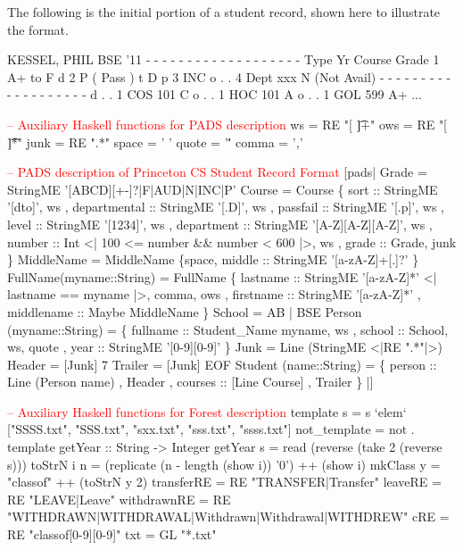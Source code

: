 The following is the initial portion of a student record, shown here
to illustrate the format.
\begin{code}
KESSEL, PHIL	   BSE   '11
- - - - - - - - - - - - - - - - - - -
Type    Yr  Course     Grade
         1             A+ to F
d        2             P  (  Pass )
t  D  p  3             INC
o  .  .  4  Dept  xxx  N  (Not Avail)
- - - - - - - - - - - - - - - - - - -
d  .  .  1  COS   101  C
o  .  .  1  HOC   101  A
o  .  .  1  GOL   599  A+
...
\end{code}

\begin{code}
\textcolor{red}{-- Auxiliary Haskell functions for PADS description}
ws   = RE "[ \t]+"
ows  = RE "[ \t]*"
junk = RE ".*"
space = ' '
quote = '\''
comma = ','
\end{code}

\begin{code}
\textcolor{red}{-- PADS description of Princeton CS Student Record Format}
[pads| 
   Grade = StringME '[ABCD][+-]?|F|AUD|N|INC|P'
\mbox{}
   Course = Course
    \{ sort         :: StringME '[dto]',      ws
    , departmental :: StringME '[.D]',       ws
    , passfail     :: StringME '[.p]',       ws
    , level        :: StringME '[1234]',          ws
    , department   :: StringME '[A-Z][A-Z][A-Z]', ws
    , number       :: Int  <| 100 <= number && number < 600 |>, ws
    , grade        :: Grade,                 junk                               
    \} 
\mbox{}
   MiddleName = MiddleName \{space, middle :: StringME '[a-zA-Z]+[.]?' \}           
\mbox{} 
   FullName(myname::String) = FullName
    \{ lastname   :: StringME '[a-zA-Z]*'   <| lastname ==  myname |>,  comma, ows     
    , firstname  :: StringME '[a-zA-Z]*' 
    , middlename :: Maybe MiddleName
    \}
\mbox{}
   School = AB | BSE
\mbox{}
   Person (myname::String) =
    \{ fullname   :: Student_Name myname,    ws
    , school     :: School,                 ws, quote
    , year       :: StringME '[0-9][0-9]'
    \}
\mbox{}
   Junk    = Line (StringME <|RE ".*"|>)
   Header  = [Junk]  7 
   Trailer = [Junk]  EOF 
\mbox{}
   Student (name::String) = 
    \{ person  :: Line (Person name)
    , Header  
    , courses :: [Line Course]
    , Trailer
    \}
|]
\end{code}

\begin{code}
\textcolor{red}{-- Auxiliary Haskell functions for Forest description}
template s = s `elem` ["SSSS.txt", "SSS.txt", "sxx.txt", "sss.txt", "ssss.txt"]
not_template = not . template
\mbox{}
getYear :: String -> Integer
getYear s = read (reverse (take 2 (reverse s)))
toStrN i n = (replicate  (n - length (show i)) '0') ++ (show i)
mkClass y = "classof" ++ (toStrN y 2)
\mbox{}
transferRE  = RE "TRANSFER|Transfer"
leaveRE     = RE "LEAVE|Leave"
withdrawnRE = RE "WITHDRAWN|WITHDRAWAL|Withdrawn|Withdrawal|WITHDREW"
cRE         = RE "classof[0-9][0-9]" 
txt         = GL "*.txt"
\end{code}


